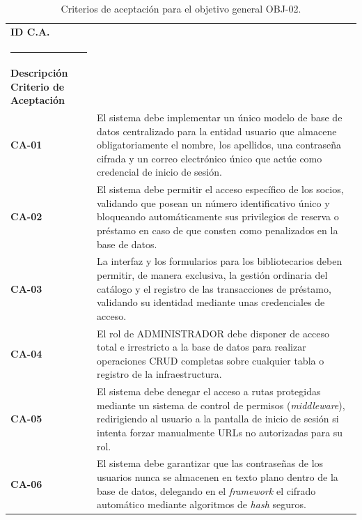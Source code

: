 \begin{table}[H]
	\centering
	\caption{Criterios de aceptación para el objetivo general OBJ-02.}
	\label{tab:criterios_aceptacion_normal02}
	\begin{tabularx}{\textwidth}{l X}
		\toprule
		\textbf{ID C.A.} & 
		\begin{minipage}[t]{\linewidth}
			\textbf{ID Objetivo asociado: OBJ-02 <Implementación del sistema de usuario con roles diferenciados>} \\[2pt]
			\rule{\linewidth}{0.4pt} \\[2pt]
			\textbf{Descripción Criterio de Aceptación}
		\end{minipage} \\
		\midrule
		\textbf{CA-01} & El sistema debe implementar un único modelo de base de datos centralizado para la entidad usuario que almacene obligatoriamente el nombre, los apellidos, una contraseña cifrada y un correo electrónico único que actúe como credencial de inicio de sesión. \\
		\addlinespace
		\textbf{CA-02} & El sistema debe permitir el acceso específico de los socios, validando que posean un número identificativo único y bloqueando automáticamente sus privilegios de reserva o préstamo en caso de que consten como penalizados en la base de datos. \\
		\addlinespace
		\textbf{CA-03} & La interfaz y los formularios para los bibliotecarios deben permitir, de manera exclusiva, la gestión ordinaria del catálogo y el registro de las transacciones de préstamo, validando su identidad mediante unas credenciales de acceso. \\
		\addlinespace
		\textbf{CA-04} & El rol de ADMINISTRADOR debe disponer de acceso total e irrestricto a la base de datos para realizar operaciones CRUD completas sobre cualquier tabla o registro de la infraestructura. \\
		\addlinespace
		\textbf{CA-05} & El sistema debe denegar el acceso a rutas protegidas mediante un sistema de control de permisos (\textit{middleware}), redirigiendo al usuario a la pantalla de inicio de sesión si intenta forzar manualmente URLs no autorizadas para su rol. \\
		\addlinespace
		\textbf{CA-06} & El sistema debe garantizar que las contraseñas de los usuarios nunca se almacenen en texto plano dentro de la base de datos, delegando en el \textit{framework} el cifrado automático mediante algoritmos de \textit{hash} seguros. \\
		\bottomrule
	\end{tabularx}	
\end{table}

